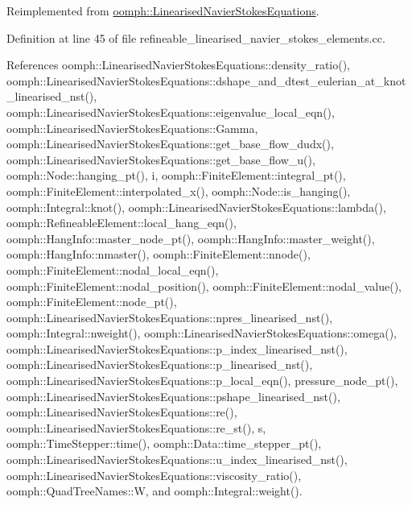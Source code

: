 Reimplemented from \hyperlink{classoomph_1_1LinearisedNavierStokesEquations_a9f6b557aa6599c067c042bc076a3bf8d}{oomph\+::\+Linearised\+Navier\+Stokes\+Equations}.



Definition at line 45 of file refineable\+\_\+linearised\+\_\+navier\+\_\+stokes\+\_\+elements.\+cc.



References oomph\+::\+Linearised\+Navier\+Stokes\+Equations\+::density\+\_\+ratio(), oomph\+::\+Linearised\+Navier\+Stokes\+Equations\+::dshape\+\_\+and\+\_\+dtest\+\_\+eulerian\+\_\+at\+\_\+knot\+\_\+linearised\+\_\+nst(), oomph\+::\+Linearised\+Navier\+Stokes\+Equations\+::eigenvalue\+\_\+local\+\_\+eqn(), oomph\+::\+Linearised\+Navier\+Stokes\+Equations\+::\+Gamma, oomph\+::\+Linearised\+Navier\+Stokes\+Equations\+::get\+\_\+base\+\_\+flow\+\_\+dudx(), oomph\+::\+Linearised\+Navier\+Stokes\+Equations\+::get\+\_\+base\+\_\+flow\+\_\+u(), oomph\+::\+Node\+::hanging\+\_\+pt(), i, oomph\+::\+Finite\+Element\+::integral\+\_\+pt(), oomph\+::\+Finite\+Element\+::interpolated\+\_\+x(), oomph\+::\+Node\+::is\+\_\+hanging(), oomph\+::\+Integral\+::knot(), oomph\+::\+Linearised\+Navier\+Stokes\+Equations\+::lambda(), oomph\+::\+Refineable\+Element\+::local\+\_\+hang\+\_\+eqn(), oomph\+::\+Hang\+Info\+::master\+\_\+node\+\_\+pt(), oomph\+::\+Hang\+Info\+::master\+\_\+weight(), oomph\+::\+Hang\+Info\+::nmaster(), oomph\+::\+Finite\+Element\+::nnode(), oomph\+::\+Finite\+Element\+::nodal\+\_\+local\+\_\+eqn(), oomph\+::\+Finite\+Element\+::nodal\+\_\+position(), oomph\+::\+Finite\+Element\+::nodal\+\_\+value(), oomph\+::\+Finite\+Element\+::node\+\_\+pt(), oomph\+::\+Linearised\+Navier\+Stokes\+Equations\+::npres\+\_\+linearised\+\_\+nst(), oomph\+::\+Integral\+::nweight(), oomph\+::\+Linearised\+Navier\+Stokes\+Equations\+::omega(), oomph\+::\+Linearised\+Navier\+Stokes\+Equations\+::p\+\_\+index\+\_\+linearised\+\_\+nst(), oomph\+::\+Linearised\+Navier\+Stokes\+Equations\+::p\+\_\+linearised\+\_\+nst(), oomph\+::\+Linearised\+Navier\+Stokes\+Equations\+::p\+\_\+local\+\_\+eqn(), pressure\+\_\+node\+\_\+pt(), oomph\+::\+Linearised\+Navier\+Stokes\+Equations\+::pshape\+\_\+linearised\+\_\+nst(), oomph\+::\+Linearised\+Navier\+Stokes\+Equations\+::re(), oomph\+::\+Linearised\+Navier\+Stokes\+Equations\+::re\+\_\+st(), s, oomph\+::\+Time\+Stepper\+::time(), oomph\+::\+Data\+::time\+\_\+stepper\+\_\+pt(), oomph\+::\+Linearised\+Navier\+Stokes\+Equations\+::u\+\_\+index\+\_\+linearised\+\_\+nst(), oomph\+::\+Linearised\+Navier\+Stokes\+Equations\+::viscosity\+\_\+ratio(), oomph\+::\+Quad\+Tree\+Names\+::W, and oomph\+::\+Integral\+::weight().



